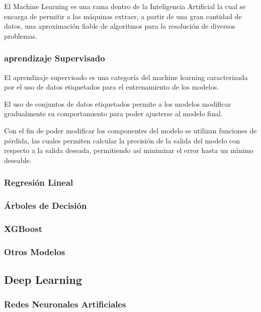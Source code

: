 \documentclass[a4paper,12pt]{article}
\begin{document}
El Machine Learning es una rama dentro de la Inteligencia
Artificial la cual se encarga de permitir a las máquinas 
extraer, a partir de una gran cantidad de datos, una 
aproximación fiable de algoritmos para la resolución de 
diversos problemas.

\subsubsection{aprendizaje Supervisado}


El aprendizaje supervisado es una categoría del machine
learning caracterizada por el uso de datos etiquetados 
para el entrenamiento de los modelos.

El uso de conjuntos de datos etiquetados permite a los
modelos modificar gradualmente su comportamiento para
poder ajusterse al modelo final.

Con el fin de poder modificar los componentes del modelo
se utilizan funciones de pérdida, las cuales permiten
calcular la precisión de la salida del modelo con respecto
a la salida deseada, permitiendo así minimizar el error
hasta un mínimo deseable.

\subsubsection{Regresión Lineal}

\subsubsection{Árboles de Decisión}

\subsubsection{XGBoost}

\subsubsection{Otros Modelos}


\subsection{Deep Learning}

\subsubsection{Redes Neuronales Artificiales}
\end{document}
